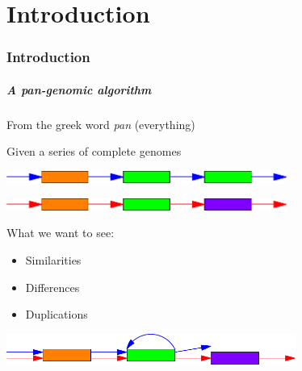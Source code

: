 \part{Introduction}
\section{Introduction}


\begin{frame}
	\partpage
	\centering
\end{frame}


\begin{frame}
	\frametitle{A pan-genomic algorithm}
	\centering
	
	From the greek word \textit{pan} (everything)
	
	\medskip
	
	Given a series of complete genomes
	
	\medskip

	\includegraphics[height=0.4cm]{images/gen1}

  \medskip
  	
	\includegraphics[height=0.4cm]{images/gen2}
	
	\pause
	
	\medskip

  What we want to see:
  
  \begin{itemize}
    \item {\color{orange}Similarities}
    \item {\color{purple}Differences}
    \item {\color{green}Duplications}
  \end{itemize}	
	
	\medskip
	
	\includegraphics[height=1cm]{images/gen3}
	
\end{frame}

